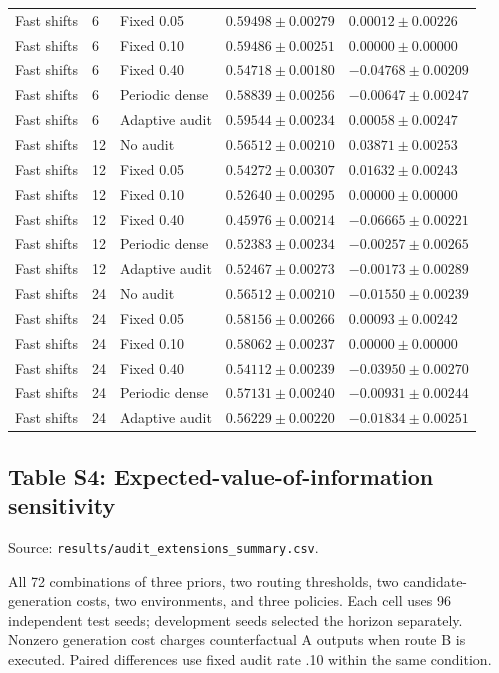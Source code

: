 \begin{longtable}{@{}lllll@{}}
Fast shifts & 6 & Fixed 0.05 & $0.59498 \pm 0.00279$ & $0.00012 \pm 0.00226$ \\
Fast shifts & 6 & Fixed 0.10 & $0.59486 \pm 0.00251$ & $0.00000 \pm 0.00000$ \\
Fast shifts & 6 & Fixed 0.40 & $0.54718 \pm 0.00180$ & $-0.04768 \pm 0.00209$ \\
Fast shifts & 6 & Periodic dense & $0.58839 \pm 0.00256$ & $-0.00647 \pm 0.00247$ \\
Fast shifts & 6 & Adaptive audit & $0.59544 \pm 0.00234$ & $0.00058 \pm 0.00247$ \\
Fast shifts & 12 & No audit & $0.56512 \pm 0.00210$ & $0.03871 \pm 0.00253$ \\
Fast shifts & 12 & Fixed 0.05 & $0.54272 \pm 0.00307$ & $0.01632 \pm 0.00243$ \\
Fast shifts & 12 & Fixed 0.10 & $0.52640 \pm 0.00295$ & $0.00000 \pm 0.00000$ \\
Fast shifts & 12 & Fixed 0.40 & $0.45976 \pm 0.00214$ & $-0.06665 \pm 0.00221$ \\
Fast shifts & 12 & Periodic dense & $0.52383 \pm 0.00234$ & $-0.00257 \pm 0.00265$ \\
Fast shifts & 12 & Adaptive audit & $0.52467 \pm 0.00273$ & $-0.00173 \pm 0.00289$ \\
Fast shifts & 24 & No audit & $0.56512 \pm 0.00210$ & $-0.01550 \pm 0.00239$ \\
Fast shifts & 24 & Fixed 0.05 & $0.58156 \pm 0.00266$ & $0.00093 \pm 0.00242$ \\
Fast shifts & 24 & Fixed 0.10 & $0.58062 \pm 0.00237$ & $0.00000 \pm 0.00000$ \\
Fast shifts & 24 & Fixed 0.40 & $0.54112 \pm 0.00239$ & $-0.03950 \pm 0.00270$ \\
Fast shifts & 24 & Periodic dense & $0.57131 \pm 0.00240$ & $-0.00931 \pm 0.00244$ \\
Fast shifts & 24 & Adaptive audit & $0.56229 \pm 0.00220$ & $-0.01834 \pm 0.00251$ \\
\end{longtable}\endgroup
\clearpage
\subsection*{Table S4: Expected-value-of-information sensitivity}
\label{supp:S4}
{\footnotesize Source: \texttt{results/audit\_extensions\_summary.csv}.}\par All 72 combinations of three priors, two routing thresholds, two candidate-generation costs, two environments, and three policies. Each cell uses 96 independent test seeds; development seeds selected the horizon separately. Nonzero generation cost charges counterfactual A outputs when route B is executed. Paired differences use fixed audit rate .10 within the same condition.


